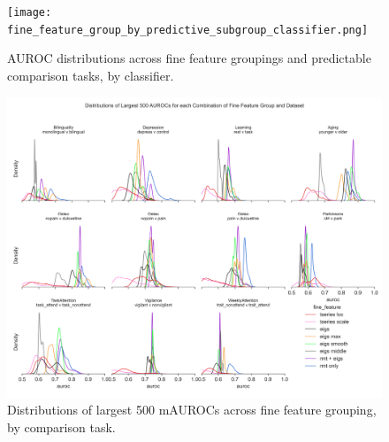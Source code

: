 \documentclass{article}  %
\begin{document}
\begin{spacing}{1}
\begin{figure}
\begin{center}
\texttt{[image: fine\_feature\_group\_by\_predictive\_subgroup\_classifier.png]}
\end{center}
\caption
{ \label{fig:fine-classifier}
AUROC distributions across fine feature groupings and predictable comparison tasks, by classifier.}
\end{figure}



\begin{figure}
\begin{center}
\includegraphics[width=\textwidth,height=0.9\textheight,keepaspectratio]{fine_feature_largest_by_subgroup.png}
\end{center}
\caption
{ \label{fig:fine-largest}
Distributions of largest 500 mAUROCs across fine feature grouping, by comparison task.}
\end{figure}




\end{spacing}
\end{document}
